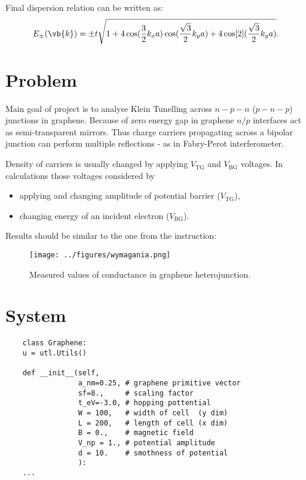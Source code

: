 \documentclass{beamer}
\begin{document}
\begin{frame}
	Final dispersion relation can be written as:
	\begin{equation}
		E_{\pm}(\vb{k}) = \pm t \sqrt{1 + 4\cos(\frac{3}{2}k_x a)\cos(\frac{\sqrt{3}}{2}k_y a) + 4 \cos[2](\frac{\sqrt{3}}{2}k_y a)}.
	\end{equation}
\end{frame}

\section{Problem}

\begin{frame}
	Main goal of project is to analyse Klein Tunelling across $n - p - n$ ($p - n - p$) junctions in graphene.
	Because of zero energy gap in graphene $n / p$ interfaces act as semi-transparent mirrors.
	Thus charge carriers propagating across a bipolar junction can perform multiple reflections - as in Fabry-Perot interferometer.

	Density of carriers is usually changed by applying $V_{\text{TG}}$ and $V_{\text{BG}}$ voltages.
	In calculations those voltages considered by
	\begin{itemize}
		\item applying and changing amplitude of potential barrier ($V_{\text{TG}}$),
		\item changing energy of an incident electron ($V_{\text{BG}}$).
	\end{itemize}
\end{frame}


\begin{frame}
	Results should be similar to the one from the instruction:
	\begin{figure}
		\centering
		\texttt{[image: ../figures/wymagania.png]}
		\caption{Measured values of conductance in graphene heterojunction.}
	\end{figure}

\end{frame}

\section{System}

\begin{frame}[fragile]
	\begin{verbatim}
    class Graphene:
    u = utl.Utils()

    def __init__(self, 
                 a_nm=0.25, # graphene primitive vector
                 sf=8.,     # scaling factor
                 t_eV=-3.0, # hopping pottential
                 W = 100,   # width of cell  (y dim)
                 L = 200,   # length of cell (x dim)
                 B = 0.,    # magnetic field
                 V_np = 1., # potential amplitude
                 d = 10.    # smothness of potential
                 ):    
    ...
    \end{verbatim}
\end{frame}
\end{document}
